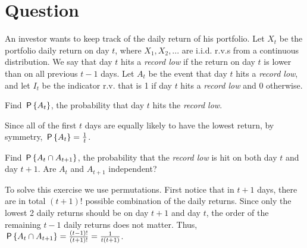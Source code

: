 \section{Question}

An investor wants to keep track of the daily return of his portfolio.  Let $X_t$ be the portfolio daily return on day $t$, where $X_1, X_2, . . . $ are i.i.d. r.v.s from a continuous distribution. We say that day $t$ hits a \textit{record low} if the return on day $t$ is lower than on all previous $t-1$ days. Let $A_t$ be the event that day $t$ hits a \textit{record low}, and let $I_{t}$ be the indicator r.v. that is 1 if day $t$ hits a \textit{record low} and 0 otherwise.

\begin{exercise}[0.5]
 Find $\P{A_t}$, the probability that day $t$ hits the \textit{record low}.
\begin{solution}
Since all of the first $t$ days are equally likely to have the lowest return, by symmetry, $\P{A_t}=\frac{1}{t}$.
\end{solution}
\end{exercise}

\begin{exercise}[1]
Find $\P{A_t \cap A_{t+1}}$, the probability that the \textit{record low} is hit on both day $t$ and day $t+1$. Are $A_t$ and $A_{t+1}$ independent? 
\begin{solution}
To solve this exercise we use permutations. First notice that in $t+1$ days, there are in total $(t+1)!$ possible combination of the  daily returns. Since only the lowest 2 daily returns should be on day $t+1$ and day $t$, the order of the remaining $t-1$ daily returns does not matter. Thus, $ \P{A_t \cap A_{t+1}}=\frac{(t-1)!}{(t+1)!}=\frac{1}{t(t+1)}$.

\end{solution}
\end{exercise}

